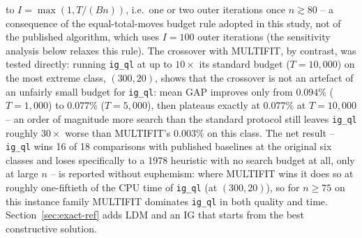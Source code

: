 \documentclass[final,3p,times,11pt,authoryear]{elsarticle}
\begin{document}
to $I = \max(1, T/(Bn))$, i.e.\ one or two outer iterations once
$n \gtrsim 80$ -- a consequence of the equal-total-moves budget rule
adopted in this study, not of the published algorithm, which uses
$I=100$ outer iterations (the sensitivity analysis below relaxes this
rule). The crossover with MULTIFIT, by contrast, was tested directly:
running \texttt{ig\_ql} at up to $10\times$ its standard budget
($T=10{,}000$) on the most extreme class, $(300,20)$, shows that the
crossover is not an artefact of an unfairly small budget for
\texttt{ig\_ql}: mean GAP improves only
from $0.094\%$ ($T=1{,}000$) to $0.077\%$ ($T=5{,}000$), then plateaus
exactly at $0.077\%$ at $T=10{,}000$ -- an order of magnitude more
search than the standard protocol still leaves \texttt{ig\_ql} roughly
$30\times$ worse than MULTIFIT's $0.003\%$ on this class. The net
result -- \texttt{ig\_ql} wins 16 of 18 comparisons with published baselines at the
original six classes and loses specifically to a 1978 heuristic with
no search budget at all, only at large $n$ -- is reported without
euphemism: where MULTIFIT wins it does so at roughly one-fiftieth of the
CPU time of \texttt{ig\_ql} (at $(300,20)$), so for $n \ge 75$ on this
instance family MULTIFIT dominates \texttt{ig\_ql} in both quality and
time. Section~\ref{sec:exact-ref} adds LDM and an IG that starts from the
best constructive solution.
\end{document}
